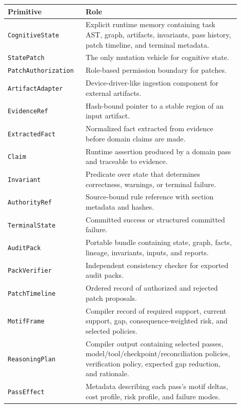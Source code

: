 \documentclass[11pt]{article}
\begin{document}
\begin{center}
\begin{tabular}{p{0.28\linewidth}p{0.62\linewidth}}
\toprule
\textbf{Primitive} & \textbf{Role} \\
\midrule
\texttt{CognitiveState} & Explicit runtime memory containing task AST, graph, artifacts, invariants, pass history, patch timeline, and terminal metadata. \\
\texttt{StatePatch} & The only mutation vehicle for cognitive state. \\
\texttt{PatchAuthorization} & Role-based permission boundary for patches. \\
\texttt{ArtifactAdapter} & Device-driver-like ingestion component for external artifacts. \\
\texttt{EvidenceRef} & Hash-bound pointer to a stable region of an input artifact. \\
\texttt{ExtractedFact} & Normalized fact extracted from evidence before domain claims are made. \\
\texttt{Claim} & Runtime assertion produced by a domain pass and traceable to evidence. \\
\texttt{Invariant} & Predicate over state that determines correctness, warnings, or terminal failure. \\
\texttt{AuthorityRef} & Source-bound rule reference with section metadata and hashes. \\
\texttt{TerminalState} & Committed success or structured committed failure. \\
\texttt{AuditPack} & Portable bundle containing state, graph, facts, lineage, invariants, inputs, and reports. \\
\texttt{PackVerifier} & Independent consistency checker for exported audit packs. \\
\texttt{PatchTimeline} & Ordered record of authorized and rejected patch proposals. \\
\texttt{MotifFrame} & Compiler record of required support, current support, gap, consequence-weighted risk, and selected policies. \\
\texttt{ReasoningPlan} & Compiler output containing selected passes, model/tool/checkpoint/reconciliation policies, verification policy, expected gap reduction, and rationale. \\
\texttt{PassEffect} & Metadata describing each pass's motif deltas, cost profile, risk profile, and failure modes. \\
\bottomrule
\end{tabular}
\end{center}
\end{document}
